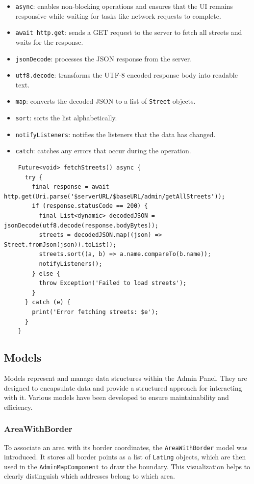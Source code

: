 \begin{itemize}
    \item \texttt{async}: enables non-blocking operations and ensures that the UI remains responsive while waiting for tasks like network requests to complete.
    \item \texttt{await http.get}: sends a GET request to the server to fetch all streets and waits for the response.
    \item \texttt{jsonDecode}: processes the JSON response from the server.
    \item \texttt{utf8.decode}: transforms the UTF-8 encoded response body into readable text.
    \item \texttt{map}: converts the decoded JSON to a list of \texttt{Street} objects.
    \item \texttt{sort}: sorts the list alphabetically.
    \item \texttt{notifyListeners}: notifies the listeners that the data has changed.
    \item \texttt{catch}: catches any errors that occur during the operation.
\end{itemize}
\lstset{style=mycsharp, caption=typical method in AdminAddressProvider}
\begin{lstlisting}
    Future<void> fetchStreets() async {
      try {
        final response = await http.get(Uri.parse('$serverURL/$baseURL/admin/getAllStreets'));
        if (response.statusCode == 200) {
          final List<dynamic> decodedJSON = jsonDecode(utf8.decode(response.bodyBytes));
          streets = decodedJSON.map((json) => Street.fromJson(json)).toList();
          streets.sort((a, b) => a.name.compareTo(b.name));
          notifyListeners();
        } else {
          throw Exception('Failed to load streets');
        }
      } catch (e) {
        print('Error fetching streets: $e');
      }
    }
\end{lstlisting}

\subsection{Models}
Models represent and manage data structures within the Admin Panel. They are designed to encapsulate data and provide a structured approach for interacting with it. Various models have been developed to ensure maintainability and efficiency.



\subsubsection{AreaWithBorder}
To associate an area with its border coordinates, the \texttt{AreaWithBorder} model was introduced. It stores all border points as a list of \texttt{LatLng} objects, which are then used in the \texttt{AdminMapComponent} to draw the boundary. This visualization helps to clearly distinguish which addresses belong to which area.

